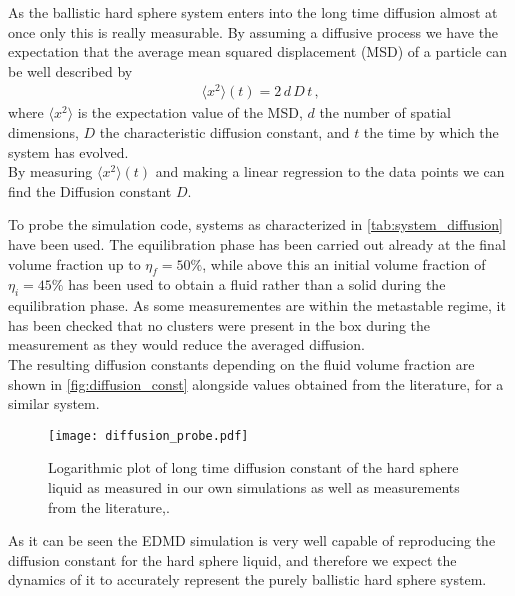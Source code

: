 As the ballistic hard sphere system enters into the long time diffusion almost at once only this is really measurable. By assuming a diffusive process we have the expectation that the average mean squared displacement (MSD) of a particle can be well described by 
\begin{align}
\label{eqn:diffusion}
\langle x^2 \rangle(t) = 2 \, d \, D \, t  \, \text{,}
\end{align}
where $\langle x^2 \rangle$ is the expectation value of the MSD, $d$ the number of spatial dimensions, $D$ the characteristic diffusion constant, and $t$ the time by which the system has evolved.\\

By measuring $\langle x^2 \rangle (t)$ and making a linear regression to the data points we can find the Diffusion constant $D$.

To probe the simulation code, systems as characterized in \autoref{tab:system_diffusion} have been used. The equilibration phase has been carried out already at the final volume fraction up to $\eta_f = 50\%$, while above this an initial volume fraction of $\eta_i = 45\%$ has been used to obtain a fluid rather than a solid during the equilibration phase. As some measurementes are within the metastable regime, it has been checked that no clusters were present in the box during the measurement as they would reduce the averaged diffusion.\\

The resulting diffusion constants depending on the fluid volume fraction are shown in \autoref{fig:diffusion_const} alongside values obtained from the literature, for a similar system.\\

\begin{figure}[h]
\centering
\texttt{[image: diffusion\_probe.pdf]}
\caption[Longtime diffusion constant at varying volume fractions]{Logarithmic plot of long time diffusion constant of the hard sphere liquid as measured in our own simulations as well as measurements from the literature\cite{Pieprzyk2019},\cite{Heyes2007}.}
\label{fig:diffusion_const}
\end{figure}

As it can be seen the EDMD simulation is very well capable of reproducing the diffusion constant for the hard sphere liquid, and therefore we expect the dynamics of it to accurately represent the purely ballistic hard sphere system.\\


